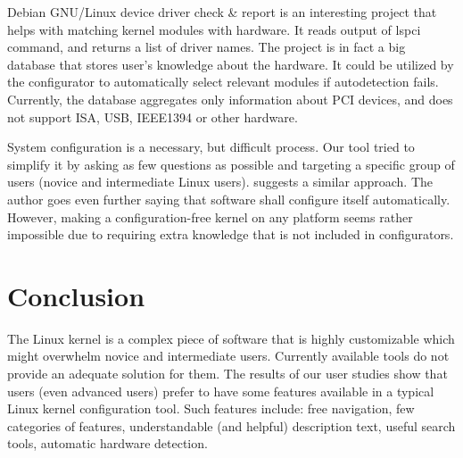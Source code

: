 \documentclass{chi2009}
\begin{document}
Debian GNU/Linux device driver check \& report \cite{muto:check:2010} is an interesting project that helps with matching kernel modules with hardware. It reads
output of \textsf{lspci} command, and returns a list of driver names. The project is in fact a big database that stores user's knowledge about the hardware. It
could be utilized by the configurator to automatically select relevant modules if autodetection fails. Currently, the database aggregates only information about
PCI devices, and does not support ISA, USB, IEEE1394 or other hardware.

System configuration is a necessary, but difficult process. Our tool tried to simplify it by asking as few questions as possible and targeting a specific group
of users (novice and intermediate Linux users). \cite{spillers:config:2010} suggests a similar approach. The author goes even further saying that software shall
configure itself automatically. However, making a configuration-free kernel on any platform seems rather impossible due to requiring extra knowledge that is not
included in configurators.

\section{Conclusion}\label{sec:conclusion}
The Linux kernel is a complex piece of software that is highly customizable which might overwhelm novice and intermediate users. Currently available tools do
not provide an adequate solution for them. The results of our user studies show that users (even advanced users) prefer to have some features available in a
typical Linux kernel configuration tool. Such features include: free navigation, few categories of features, understandable (and helpful) description text,
useful search tools, automatic hardware detection.



\end{document}
